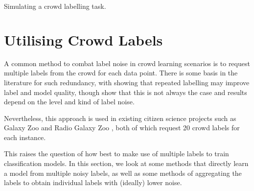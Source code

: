         \begin{algorithm}[H]

            \caption{Simulating a crowd labelling task.}
            \label{alg:simulated-crowd}
        \end{algorithm}

\section{Utilising Crowd Labels}
\label{sec:crowd-labels}


    A common method to combat label noise in crowd learning scenarios is to
    request multiple labels from the crowd for each data point.  There is some
    basis in the literature for such redundancy, with \citet{sheng08} showing
    that repeated labelling may improve label and model quality, though
    \citet{lin14} show that this is not always the case and results depend on
    the level and kind of label noise.

    Nevertheless, this approach is used in existing citizen science projects
    such as Galaxy Zoo \citep{lintott08} and Radio Galaxy Zoo
    \citep{banfield15}, both of which request 20 crowd labels for each instance.

    This raises the question of how best to make use of multiple labels to train
    classification models. In this section, we look at some methods that
    directly learn a model from multiple noisy labels, as well as some methods
    of aggregating the labels to obtain individual labels with (ideally) lower
    noise.

